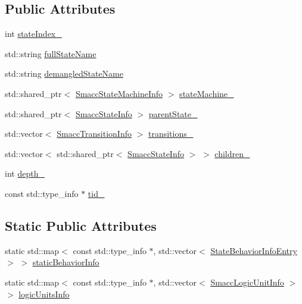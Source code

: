 \subsection*{Public Attributes}
\begin{DoxyCompactItemize}
\item 
int \hyperlink{classsmacc_1_1SmaccStateInfo_a43292879ca69576cb835a1cf3f119826}{state\+Index\+\_\+}
\item 
std\+::string \hyperlink{classsmacc_1_1SmaccStateInfo_a3d9d81ebeda351fba21665bb7b9ff148}{full\+State\+Name}
\item 
std\+::string \hyperlink{classsmacc_1_1SmaccStateInfo_ad36e29f3984e40d36664567f9703239a}{demangled\+State\+Name}
\item 
std\+::shared\+\_\+ptr$<$ \hyperlink{classsmacc_1_1SmaccStateMachineInfo}{Smacc\+State\+Machine\+Info} $>$ \hyperlink{classsmacc_1_1SmaccStateInfo_af9884b3fda41fbc87abf9908b8bd72e7}{state\+Machine\+\_\+}
\item 
std\+::shared\+\_\+ptr$<$ \hyperlink{classsmacc_1_1SmaccStateInfo}{Smacc\+State\+Info} $>$ \hyperlink{classsmacc_1_1SmaccStateInfo_ae19f4efbeb2ca665b320df80766d9209}{parent\+State\+\_\+}
\item 
std\+::vector$<$ \hyperlink{structsmacc_1_1SmaccTransitionInfo}{Smacc\+Transition\+Info} $>$ \hyperlink{classsmacc_1_1SmaccStateInfo_ab7945472d7b14c50c908b1d1d0c87866}{transitions\+\_\+}
\item 
std\+::vector$<$ std\+::shared\+\_\+ptr$<$ \hyperlink{classsmacc_1_1SmaccStateInfo}{Smacc\+State\+Info} $>$ $>$ \hyperlink{classsmacc_1_1SmaccStateInfo_a7773f1d9e865a839b0bfed087bbb93ba}{children\+\_\+}
\item 
int \hyperlink{classsmacc_1_1SmaccStateInfo_a3f44d5af069d0f37ed63b3101b330a65}{depth\+\_\+}
\item 
const std\+::type\+\_\+info $\ast$ \hyperlink{classsmacc_1_1SmaccStateInfo_adaed55d2f9b823cd2ff0df04aaab1d1c}{tid\+\_\+}
\end{DoxyCompactItemize}
\subsection*{Static Public Attributes}
\begin{DoxyCompactItemize}
\item 
static std\+::map$<$ const std\+::type\+\_\+info $\ast$, std\+::vector$<$ \hyperlink{structsmacc_1_1StateBehaviorInfoEntry}{State\+Behavior\+Info\+Entry} $>$ $>$ \hyperlink{classsmacc_1_1SmaccStateInfo_a2cc62c6c9dec1a4f5294f8430efb71f2}{static\+Behavior\+Info}
\item 
static std\+::map$<$ const std\+::type\+\_\+info $\ast$, std\+::vector$<$ \hyperlink{structsmacc_1_1SmaccLogicUnitInfo}{Smacc\+Logic\+Unit\+Info} $>$ $>$ \hyperlink{classsmacc_1_1SmaccStateInfo_a7a22f3c1ea22042a19f897db4ecfeb67}{logic\+Units\+Info}
\end{DoxyCompactItemize}


